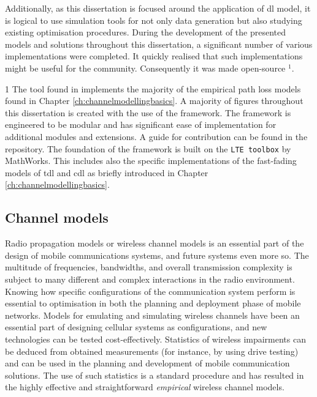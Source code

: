 Additionally, as this dissertation is focused around the application of \gls{dl} model, it is logical to use simulation tools for not only data generation but also studying existing optimisation procedures. During the development of the presented models and solutions throughout this dissertation, a significant number of various implementations were completed. It quickly realised that such implementations might be useful for the community. Consequently it was made open-source \cite{monster}$^1$.
\begin{marginfigure}
1 The tool found in \cite{monster} implements the majority of the empirical path loss models found in Chapter \ref{ch:channelmodellingbasics}. A majority of figures throughout this dissertation is created with the use of the framework. The framework is engineered to be modular and has significant ease of implementation for additional modules and extensions. A guide for contribution can be found in the repository. The foundation of the framework is built on the \texttt{LTE toolbox} by MathWorks. This includes also the specific implementations of the fast-fading models of \gls{tdl} and \gls{cdl} as briefly introduced in Chapter \ref{ch:channelmodellingbasics}.
\end{marginfigure}


\subsection{Channel models}

Radio propagation models or wireless channel models is an essential part of the design of mobile communications systems, and future systems even more so. The multitude of frequencies, bandwidths, and overall transmission complexity is subject to many different and complex interactions in the radio environment. Knowing how specific configurations of the communication system perform is essential to optimisation in both the planning and deployment phase of mobile networks. Models for emulating and simulating wireless channels have been an essential part of designing cellular systems as configurations, and new technologies can be tested cost-effectively. Statistics of wireless impairments can be deduced from obtained measurements (for instance, by using drive testing) and can be used in the planning and development of mobile communication solutions. The use of such statistics is a standard procedure and has resulted in the highly effective and straightforward \emph{empirical} wireless channel models. 

